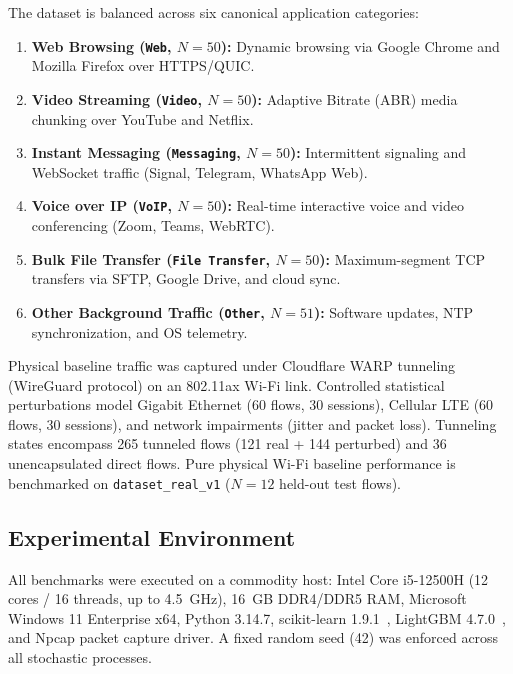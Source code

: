 \documentclass[conference]{IEEEtran}
\begin{document}
The dataset is balanced across six canonical application categories:
\begin{enumerate}
    \item \textbf{Web Browsing (\texttt{Web}, $N=50$):} Dynamic browsing via Google Chrome and Mozilla Firefox over HTTPS/QUIC.
    \item \textbf{Video Streaming (\texttt{Video}, $N=50$):} Adaptive Bitrate (ABR) media chunking over YouTube and Netflix.
    \item \textbf{Instant Messaging (\texttt{Messaging}, $N=50$):} Intermittent signaling and WebSocket traffic (Signal, Telegram, WhatsApp Web).
    \item \textbf{Voice over IP (\texttt{VoIP}, $N=50$):} Real-time interactive voice and video conferencing (Zoom, Teams, WebRTC).
    \item \textbf{Bulk File Transfer (\texttt{File Transfer}, $N=50$):} Maximum-segment TCP transfers via SFTP, Google Drive, and cloud sync.
    \item \textbf{Other Background Traffic (\texttt{Other}, $N=51$):} Software updates, NTP synchronization, and OS telemetry.
\end{enumerate}

Physical baseline traffic was captured under Cloudflare WARP tunneling (WireGuard protocol) on an 802.11ax Wi-Fi link. Controlled statistical perturbations model Gigabit Ethernet (60 flows, 30 sessions), Cellular LTE (60 flows, 30 sessions), and network impairments (jitter and packet loss). Tunneling states encompass 265 tunneled flows (121 real + 144 perturbed) and 36 unencapsulated direct flows. Pure physical Wi-Fi baseline performance is benchmarked on \texttt{dataset\_real\_v1} ($N=12$ held-out test flows).

\subsection{Experimental Environment}
All benchmarks were executed on a commodity host: Intel Core i5-12500H (12 cores / 16 threads, up to 4.5~GHz), 16~GB DDR4/DDR5 RAM, Microsoft Windows 11 Enterprise x64, Python 3.14.7, scikit-learn 1.9.1~\cite{pedregosa2011scikit}, LightGBM 4.7.0~\cite{ke2017lightgbm}, and Npcap packet capture driver. A fixed random seed (42) was enforced across all stochastic processes.
\end{document}
